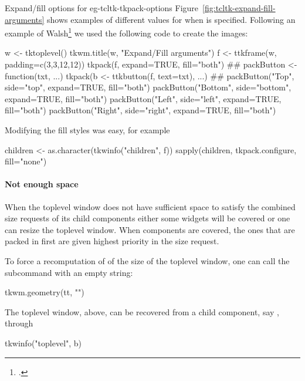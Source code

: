 \begin{example}{Expand/fill options for }{eg-tcltk-tkpack-options}
Figure~\ref{fig:tcltk-expand-fill-arguments} shows examples of
different values for  when  is
specified. Following an example of Walsh\footcite{Walsh} we used the following code to create the
images:
\begin{Schunk}
\begin{Sinput}
 w <- tktoplevel()
 tkwm.title(w, "Expand/Fill arguments")
 f <- ttkframe(w, padding=c(3,3,12,12))
 tkpack(f, expand=TRUE, fill="both")
 ##
 packButton <- function(txt, ...) 
   tkpack(b <- ttkbutton(f, text=txt), ...)
 ##
 packButton("Top",    side="top",    expand=TRUE, fill="both") 
 packButton("Bottom", side="bottom", expand=TRUE, fill="both") 
 packButton("Left",   side="left",   expand=TRUE, fill="both") 
 packButton("Right",  side="right",  expand=TRUE, fill="both") 
\end{Sinput}
\end{Schunk}
%

Modifying the fill styles was easy, for example
\begin{Schunk}
\begin{Sinput}
 children <- as.character(tkwinfo("children", f))
 sapply(children, tkpack.configure, fill="none")
\end{Sinput}
\end{Schunk}
\end{example}



\paragraph{Not enough space}
When the toplevel window does not have sufficient space to satisfy the
combined size requests of its child components either some
widgets will be covered or one can resize the toplevel window.
When components are covered, the ones that are packed in first are given
highest priority in the size request.

To force a recomputation of of the size of the toplevel window, one can
call the  subcommand with an empty string:
\begin{Schunk}
\begin{Sinput}
 tkwm.geometry(tt, "")
\end{Sinput}
\end{Schunk}
%
The toplevel window,  above, can be recovered from a child
component, say , through
\begin{Schunk}
\begin{Sinput}
 tkwinfo("toplevel", b)
\end{Sinput}
\end{Schunk}


